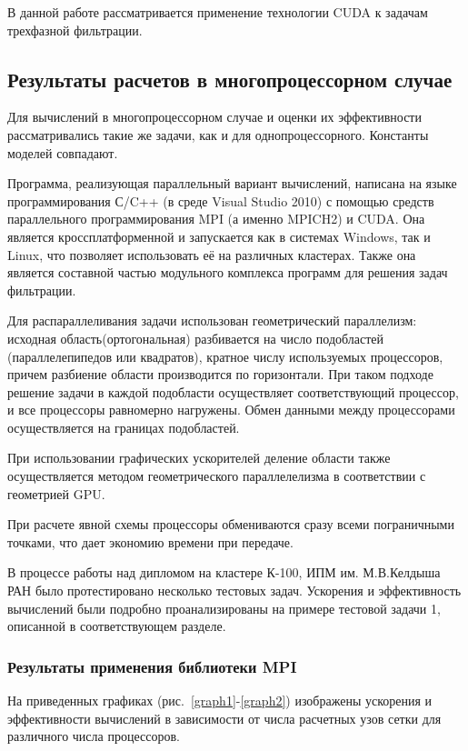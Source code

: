 В данной работе рассматривается применение технологии CUDA к задачам 
трехфазной фильтрации.

\subsection{Результаты расчетов в многопроцессорном случае}

Для вычислений в многопроцессорном случае и оценки их эффективности
рассматривались такие же задачи, как и для однопроцессорного. Константы моделей
совпадают.

Программа, реализующая параллельный вариант вычислений, написана на языке
программирования С/C++ (в среде Visual Studio 2010) с помощью средств
параллельного программирования MPI (а именно MPICH2) и CUDA. Она является
кроссплатформенной и запускается как в системах Windows, так и Linux, что
позволяет использовать её на различных кластерах. Также она является составной
частью модульного комплекса программ для решения задач фильтрации. 

Для распараллеливания задачи использован геометрический параллелизм: исходная 
область(ортогональная) разбивается на число подобластей (параллелепипедов или квадратов), 
кратное числу
используемых процессоров, причем разбиение области производится по горизонтали.
При таком подходе решение задачи в каждой подобласти осуществляет
соответствующий процессор, и все процессоры равномерно нагружены. Обмен данными
между процессорами осуществляется  на границах подобластей.

При использовании графических ускорителей деление области также осуществляется
методом геометрического параллелелизма в соответствии с геометрией GPU. 
	
При расчете явной схемы процессоры обмениваются сразу всеми пограничными
точками, что дает экономию времени при передаче. 

В процессе работы над дипломом на кластере К-100, ИПМ им. М.В.Келдыша РАН
было протестировано несколько тестовых задач. Ускорения и эффективность вычислений
были подробно проанализированы на примере тестовой задачи 1, описанной в соответствующем
разделе. 

\subsubsection{Результаты применения библиотеки MPI}

На приведенных графиках (рис.~\ref{graph1}-\ref{graph2}) изображены
ускорения и эффективности вычислений в зависимости от числа расчетных узов сетки для 
различного числа процессоров.

